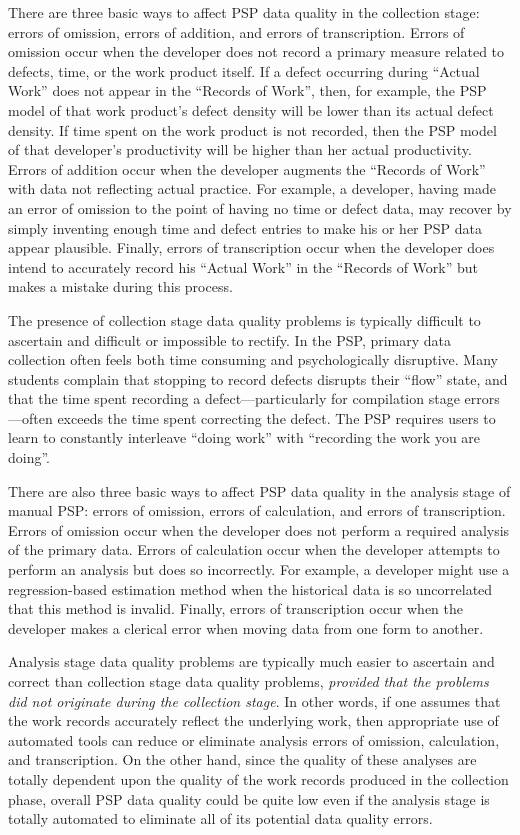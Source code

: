 There are three basic ways to affect PSP data quality in the collection
stage: errors of omission, errors of addition, and errors of transcription.
Errors of omission occur when the developer does not record a primary
measure related to defects, time, or the work product itself.  If a defect
occurring during ``Actual Work'' does not appear in the ``Records of
Work'', then, for example, the PSP model of that work product's defect
density will be lower than its actual defect density. If time spent on the
work product is not recorded, then the PSP model of that developer's
productivity will be higher than her actual productivity. Errors of
addition occur when the developer augments the ``Records of Work'' with
data not reflecting actual practice. For example, a developer, having made
an error of omission to the point of having no time or defect data, may
recover by simply inventing enough time and defect entries to make his or
her PSP data appear plausible. Finally, errors of transcription occur when
the developer does intend to accurately record his ``Actual Work'' in the
``Records of Work'' but makes a mistake during this process.

The presence of collection stage data quality problems is typically
difficult to ascertain and difficult or impossible to rectify. In the
PSP, primary data collection often feels both time consuming and
psychologically disruptive.  Many students complain that stopping to record
defects disrupts their ``flow'' state, and that the time spent recording a
defect---particularly for compilation stage errors---often exceeds the time
spent correcting the defect.  The PSP requires users to learn to constantly
interleave ``doing work'' with ``recording the work you are doing''.

There are also three basic ways to affect PSP data quality in the analysis
stage of manual PSP: errors of omission, errors of calculation, and errors of
transcription.  Errors of omission occur when the developer does not
perform a required analysis of the primary data. Errors of calculation
occur when the developer attempts to perform an analysis but does so
incorrectly. For example, a developer might use a regression-based
estimation method when the historical data is so uncorrelated that this
method is invalid. Finally, errors of transcription occur when the
developer makes a clerical error when moving data from one form to another.

Analysis stage data quality problems are typically much
easier to ascertain and correct than collection stage data
quality problems, {\em provided that the problems did not originate
  during the collection stage}.  In other words, if one assumes that the
work records accurately reflect the underlying work, then appropriate use
of automated tools can reduce or eliminate analysis errors of omission,
calculation, and transcription.  On the other hand, since the quality of
these analyses are totally dependent upon the quality of the work records
produced in the collection phase,
overall PSP data quality could be quite low even if the analysis stage is
totally automated to eliminate all of its potential data quality errors.







